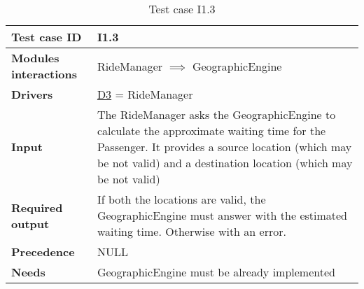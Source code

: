 \begin{table}[H]
\begin{tabular}{ l | p{} }
\textbf{Test case ID} & I1.3 \\ \hline
\textbf{Modules interactions} & RideManager $\implies$ GeographicEngine \\ \hline
\textbf{Drivers} &  \hyperref[D3]{D3} = RideManager \\ \hline
\textbf{Input} & The RideManager asks the GeographicEngine to calculate the approximate waiting time for the Passenger. It provides a source location (which may be not valid) and a destination location (which may be not valid) \\ \hline
\textbf{Required output} & If both the locations are valid, the GeographicEngine must answer with the estimated waiting time. Otherwise with an error. \\ \hline
\textbf{Precedence} & NULL \\ \hline
\textbf{Needs} & GeographicEngine must be already implemented
\end{tabular}
\caption{Test case I1.3}
\end{table}